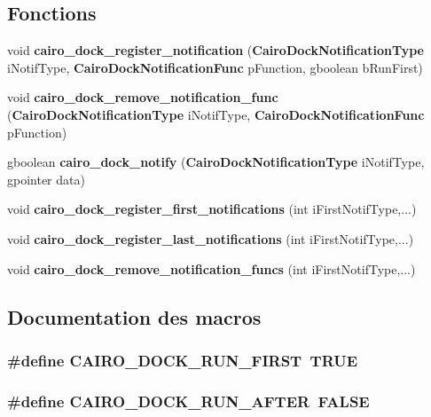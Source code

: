 \subsection*{Fonctions}
\begin{CompactItemize}
\item 
void {\bf cairo\_\-dock\_\-register\_\-notification} ({\bf CairoDockNotificationType} iNotifType, {\bf CairoDockNotificationFunc} pFunction, gboolean bRunFirst)
\item 
void {\bf cairo\_\-dock\_\-remove\_\-notification\_\-func} ({\bf CairoDockNotificationType} iNotifType, {\bf CairoDockNotificationFunc} pFunction)
\item 
gboolean {\bf cairo\_\-dock\_\-notify} ({\bf CairoDockNotificationType} iNotifType, gpointer data)
\item 
void {\bf cairo\_\-dock\_\-register\_\-first\_\-notifications} (int iFirstNotifType,...)
\item 
void {\bf cairo\_\-dock\_\-register\_\-last\_\-notifications} (int iFirstNotifType,...)
\item 
void {\bf cairo\_\-dock\_\-remove\_\-notification\_\-funcs} (int iFirstNotifType,...)
\end{CompactItemize}


\subsection{Documentation des macros}
\subsubsection{\setlength{\rightskip}{0pt plus 5cm}\#define CAIRO\_\-DOCK\_\-RUN\_\-FIRST~TRUE}\label{cairo-dock-notifications_8h_0f0d24de89673000b20e76a086789184}


\subsubsection{\setlength{\rightskip}{0pt plus 5cm}\#define CAIRO\_\-DOCK\_\-RUN\_\-AFTER~FALSE}\label{cairo-dock-notifications_8h_3c01943fe3794ca048f867b3dfaefbe0}


